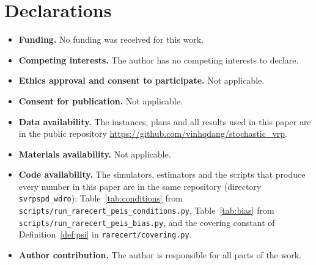 \documentclass[pdflatex,sn-mathphys-ay]{sn-jnl}%
\theoremstyle{thmstyleone}%
\theoremstyle{thmstylethree}%
\theoremstyle{thmstyletwo}%
\begin{document}
\section*{Declarations}

\begin{itemize}
\item \textbf{Funding.} No funding was received for this work.
\item \textbf{Competing interests.} The author has no competing interests to declare.
\item \textbf{Ethics approval and consent to participate.} Not applicable.
\item \textbf{Consent for publication.} Not applicable.
\item \textbf{Data availability.} The instances, plans and all results used in this paper
are in the public repository \url{https://github.com/vinhqdang/stochastic_vrp}.
\item \textbf{Materials availability.} Not applicable.
\item \textbf{Code availability.} The simulators, estimators and the scripts that produce
every number in this paper are in the same repository (directory
\texttt{svrpspd\_wdro}): Table~\ref{tab:conditions} from
\texttt{scripts/run\_rarecert\_peis\_conditions.py}, Table~\ref{tab:bias} from
\texttt{scripts/run\_rarecert\_peis\_bias.py}, and the covering constant of
Definition~\ref{def:psi} in \texttt{rarecert/covering.py}.
\item \textbf{Author contribution.} The author is responsible for all parts of the work.
\end{itemize}


\end{document}

